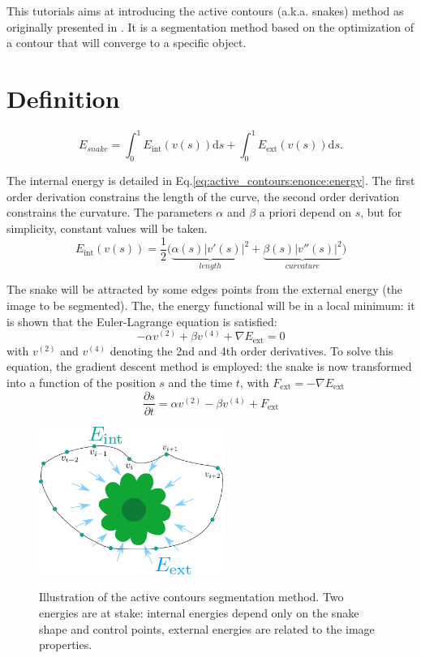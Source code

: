 \def\difficulty{3}
\begin{note}This tutorials aims at introducing the active contours (a.k.a. snakes) method as originally presented in \cite{Kass1988}. It is a segmentation method based on the optimization of a contour that will converge to a specific object.\end{note}

\vspace*{-8pt}

\section{Definition}

\vspace*{-8pt}

\textls[-20]{A snake is a parametric curve $v(s)$ with $s\!\in\![0;1[$. The energy functional is represented by:}
$$E_{snake}=\int_0^1 E_{\textrm{int}}(v(s))\textrm{d}s+\int_0^1 E_{\textrm{ext}}(v(s)) \textrm{d}s.$$

The internal energy is detailed in Eq.\ref{eq:active_contours:enonce:energy}. The first order derivation constrains the length of the curve, 
the second order derivation constrains the curvature. The parameters $\alpha$ and $\beta$ a priori depend on $s$, but for simplicity, constant values will be taken.
\begin{equation}E_{\textrm{int}}(v(s)) = \frac{1}{2}\bigg(\underbrace{\alpha(s)|v'(s)|^2}_{length} + \underbrace{\beta(s)|v''(s)|^2}_{curvature}\bigg)
 \label{eq:active_contours:enonce:energy}
\end{equation}

The snake will be attracted by some edges points from the external energy (the image to be segmented). The, the energy functional will be in a local minimum: 
it is shown that the Euler-Lagrange equation is satisfied:
$$-\alpha v^{(2)} + \beta v^{(4)}+\nabla E_\textrm{ext}=0$$
with $v^{(2)}$ and $v^{(4)}$ denoting the 2nd and 4th order derivatives. To solve this equation, the gradient descent method is employed: the snake is 
now transformed into a function of the position $s$ and the time $t$, with $F_\textrm{ext}=-\nabla E_\textrm{ext}$
$$\frac{\partial s}{\partial t} = \alpha v^{(2)} - \beta v^{(4)}+ F_\textrm{ext}$$

\begin{figure}[H]
 \centering\caption{Illustration of the active contours segmentation method. Two energies are at stake: internal energies depend only on the snake shape and control points, external energies are related to the image properties.}%
 \includegraphics[width=6cm]{snake.pdf}
 \label{fig:active_contours:enonce:snake}
\end{figure}

